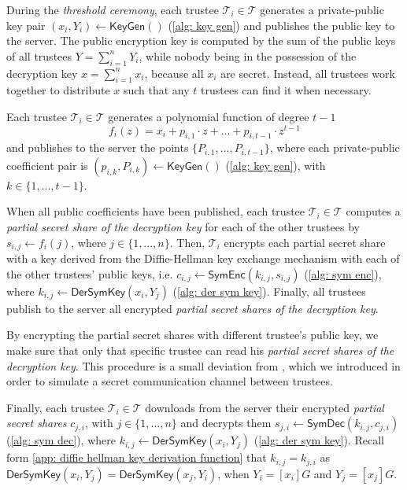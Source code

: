 During the \textit{threshold ceremony}, each trustee $\mathcal{T}_i \in \boldsymbol{\mathcal{T}}$ generates a private-public key pair $(x_i, Y_i) \gets \mathsf{KeyGen}()$ (\cref{alg: key gen}) and publishes the public key to the server. The public encryption key is computed by the sum of the public keys of all trustees $Y = \sum_{i=1}^n Y_i$, while nobody being in the possession of the decryption key $x = \sum_{i=1}^n x_i$, because all $x_i$ are secret. Instead, all trustees work together to distribute $x$ such that any $t$ trustees can find it when necessary. 

Each trustee $\mathcal{T}_i \in \boldsymbol{\mathcal{T}}$ generates a polynomial function of degree $t-1$
\[
f_i(z) = x_i + p_{i, 1} \cdot z + ... + p_{i, t-1} \cdot z^{t-1}
\]
and publishes to the server the points $\{ P_{i, 1}, ..., P_{i, t-1} \}$, where each private-public coefficient pair is $(p_{i, k}, P_{i, k}) \gets \mathsf{KeyGen}()$ (\cref{alg: key gen}), with $k \in \{ 1, ..., t-1 \}$.

When all public coefficients have been published, each trustee $\mathcal{T}_i \in \boldsymbol{\mathcal{T}}$ computes a \textit{partial secret share of the decryption key} for each of the other trustees by $s_{i, j} \gets f_i(j)$, where $j \in \{ 1, ..., n \}$. Then, $\mathcal{T}_i$ encrypts each partial secret share with a key derived from the Diffie-Hellman key exchange mechanism with each of the other trustees' public keys, i.e. $c_{i, j} \gets \mathsf{SymEnc}(k_{i, j}, s_{i, j})$ (\cref{alg: sym enc}), where $k_{i, j} \gets \mathsf{DerSymKey} (x_i, Y_j)$ (\cref{alg: der sym key}). Finally, all trustees publish to the server all encrypted \textit{partial secret shares of the decryption key}.

By encrypting the partial secret shares with different trustee's public key, we make sure that only that specific trustee can read his \textit{partial secret shares of the decryption key}. This procedure is a small deviation from \cite{Pedersen91}, which we introduced in order to simulate a secret communication channel between trustees.

Finally, each trustee $\mathcal{T}_i \in \boldsymbol{\mathcal{T}}$ downloads from the server their encrypted \textit{partial secret shares} $c_{j, i}$, with $j \in \{ 1, ..., n \}$ and decrypts them $s_{j, i} \gets \mathsf{SymDec}(k_{i, j}, c_{j, i})$ (\cref{alg: sym dec}), where $k_{i, j} \gets \mathsf{DerSymKey} (x_i, Y_j)$ (\cref{alg: der sym key}). Recall form \cref{app: diffie hellman key derivation function} that $k_{i, j} = k_{j, i}$ as $\mathsf{DerSymKey} (x_i, Y_j) = \mathsf{DerSymKey} (x_j, Y_i)$, when $Y_i = [x_i]G$ and $Y_j = [x_j]G$.

